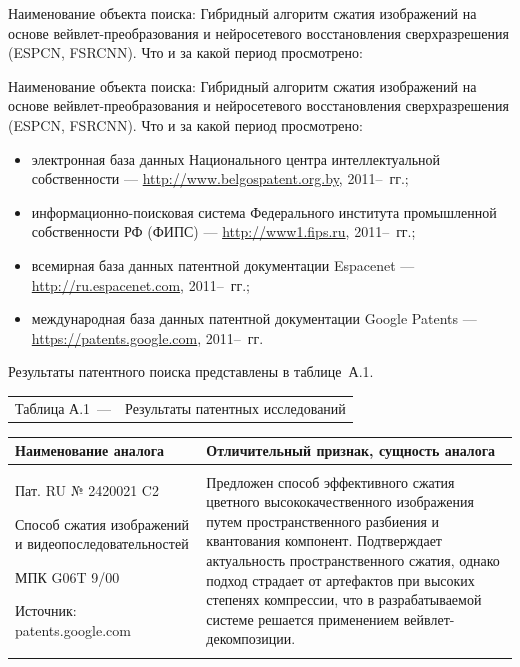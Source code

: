 \label{sec:appendix_a}

Наименование объекта поиска: Гибридный алгоритм сжатия изображений на основе вейвлет-преобразования и нейросетевого восстановления сверхразрешения (ESPCN, FSRCNN).
Что и за какой период просмотрено:

Наименование объекта поиска: Гибридный алгоритм сжатия изображений на основе вейвлет-преобразования и нейросетевого восстановления сверхразрешения (ESPCN, FSRCNN).
Что и за какой период просмотрено:
\begin{itemize}
    \item электронная база данных Национального центра интеллектуальной собственности --- \url{http://www.belgospatent.org.by}, 2011--\targetYear~гг.;
    \item информационно-поисковая система Федерального института промышленной собственности РФ (ФИПС) --- \url{http://www1.fips.ru}, 2011--\targetYear~гг.;
    \item всемирная база данных патентной документации Espacenet --- \url{http://ru.espacenet.com}, 2011--\targetYear~гг.;
    \item международная база данных патентной документации Google Patents --- \url{https://patents.google.com}, 2011--\targetYear~гг.
\end{itemize}

Результаты патентного поиска представлены в таблице~А.1.

\vspace{1em}
\noindent\begin{tabularx}{\textwidth}{@{}l X@{}}
Таблица А.1~--- & Результаты патентных исследований
\end{tabularx}
\vspace{0.5em}

\noindent
\begin{tabularx}{\textwidth}{|p{}|X|}
\hline
\centering Наименование аналога & \centering\arraybackslash Отличительный признак, сущность аналога \\ \hline
Пат. RU № 2420021 C2\par Способ сжатия изображений и видеопоследовательностей\par МПК G06T 9/00\par Источник: patents.google.com &
Предложен способ эффективного сжатия цветного высококачественного изображения путем пространственного разбиения и квантования компонент. Подтверждает актуальность пространственного сжатия, однако подход страдает от артефактов при высоких степенях компрессии, что в разрабатываемой системе решается применением вейвлет-декомпозиции.
\\ \hline
\end{tabularx}

